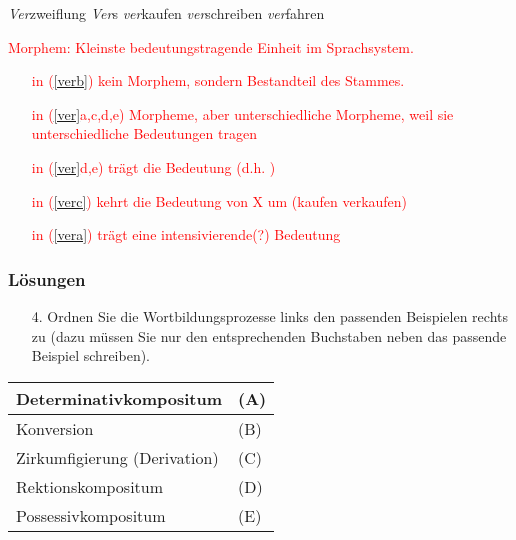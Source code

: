 {\begin{frame}
\begin{itemize}
	\eal \label{ver}
	\ex\label{vera}  \emph{Ver}zweiflung
	\ex\label{verb} \emph{Ver}s
	\ex \label{verc} \emph{ver}kaufen
	\ex\label{verd}  \emph{ver}schreiben
	\ex\label{vere} \emph{ver}fahren
	\zl
	
	\textcolor{red}{
		Morphem: Kleinste bedeutungstragende Einheit im Sprachsystem.	
		\begin{itemize}
			\item[]  in (\ref{verb})  \ras kein Morphem, sondern Bestandteil des Stammes.
			\item[]  in (\ref{ver}a,c,d,e) \ras Morpheme, aber unterschiedliche Morpheme, weil sie unterschiedliche Bedeutungen tragen
			\item[]  in (\ref{ver}d,e) trägt die Bedeutung  (d.h. )
			\item[]  in (\ref{verc}) kehrt die Bedeutung von X um (kaufen \ras verkaufen)
			\item[]  in (\ref{vera}) trägt eine intensivierende(?) Bedeutung
		\end{itemize}
	}
\end{itemize}
\end{frame}




\begin{frame}
\frametitle{Lösungen}

\begin{itemize}
	\item[4.] Ordnen Sie die Wortbildungsprozesse links den passenden Beispielen rechts zu (dazu müssen Sie nur den entsprechenden Buchstaben neben das passende Beispiel schreiben). %
\end{itemize}

	\begin{table}[h!]
	\begin{minipage}{0.4\linewidth}
		\centering
		\begin{tabular}{|l|p{}|}
			\hline 
			Determinativkompositum & (A)\\
			\hline
			Konversion & (B)\\
			\hline
			Zirkumfigierung (Derivation) & (C)\\
			\hline
			Rektionskompositum & (D)\\
			\hline
			Possessivkompositum & (E)\\
			\hline 
		\end{tabular}
		

\end{minipage}
\end{table}
\end{frame}}
